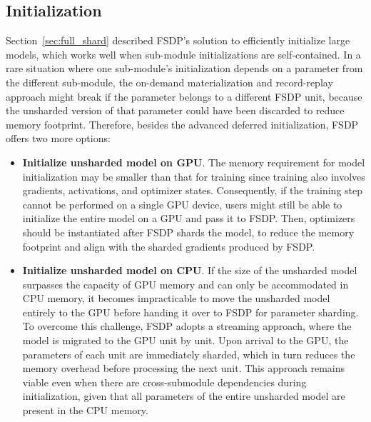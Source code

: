 \subsection{Initialization}

Section~\ref{sec:full_shard} described FSDP's solution to efficiently initialize large models, which works well when sub-module initializations are self-contained. In a rare situation where one sub-module's initialization depends on a parameter from the different sub-module, the on-demand materialization and record-replay approach might break if the parameter belongs to a different FSDP unit, because the unsharded version of that parameter could have been discarded to reduce memory footprint. Therefore, besides the advanced deferred initialization, FSDP offers two more options:

\begin{itemize}
    \item \textbf{Initialize unsharded model on GPU}. The memory requirement for model initialization may be smaller than that for training since training also involves gradients, activations, and optimizer states. Consequently, if the training step cannot be performed on a single GPU device, users might still be able to initialize the entire model on a GPU and pass it to FSDP. Then, optimizers should be instantiated after FSDP shards the model, to reduce the memory footprint and align with the sharded gradients produced by FSDP.
    \item \textbf{Initialize unsharded model on CPU}. If the size of the unsharded model surpasses the capacity of GPU memory and can only be accommodated in CPU memory, it becomes impracticable to move the unsharded model entirely to the GPU before handing it over to FSDP for parameter sharding. To overcome this challenge, FSDP adopts a streaming approach, where the model is migrated to the GPU unit by unit. Upon arrival to the GPU, the parameters of each unit are immediately sharded, which in turn reduces the memory overhead before processing the next unit. This approach remains viable even when there are cross-submodule dependencies during initialization, given that all parameters of the entire unsharded model are present in the CPU memory.
\end{itemize}


